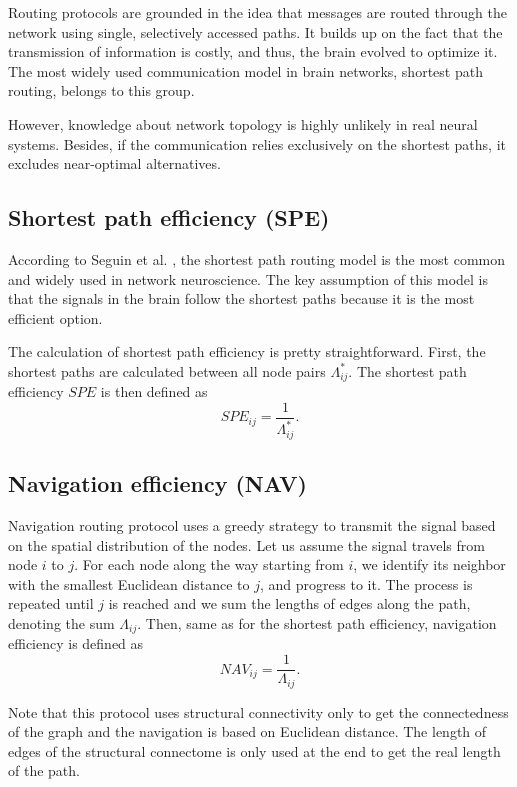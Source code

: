 Routing protocols are grounded in the idea that messages are routed through the network using single, selectively accessed paths. It builds up on the fact that the transmission of information is costly, and thus, the brain evolved to optimize it. The most widely used communication model in brain networks, shortest path routing, belongs to this group. \cite{seguin_brain_2023}

However, knowledge about network topology is highly unlikely in real neural systems. Besides, if the communication relies exclusively on the shortest paths, it excludes near-optimal alternatives. \cite{avena-koenigsberger_communication_2018}

\subsection{Shortest path efficiency (SPE)}

According to Seguin et al. \cite{seguin_brain_2023}, the shortest path routing model is the most common and widely used in network neuroscience. The key assumption of this model is that the signals in the brain follow the shortest paths because it is the most efficient option.

The calculation of shortest path efficiency is pretty straightforward. First, the shortest paths are calculated between all node pairs $\Lambda^*_{ij}$. The shortest path efficiency $SPE$ is then defined as 
$$
SPE_{ij}=\frac{1}{\Lambda^*_{ij}}.
$$

\subsection{Navigation efficiency (NAV)}

Navigation routing protocol uses a greedy strategy to transmit the signal  based on the spatial distribution of the nodes. Let us assume the signal travels from node $i$ to $j$. For each node along the way starting from $i$, we identify its neighbor with the smallest Euclidean distance to $j$, and progress to it. The process is repeated until $j$ is reached and we sum the lengths of edges along the path, denoting the sum $\Lambda_{ij}$. Then, same as for the shortest path efficiency, navigation efficiency is defined as 
$$
NAV_{ij}=\frac{1}{\Lambda_{ij}}.
$$

Note that this protocol uses structural connectivity only to get the connectedness of the graph and the navigation is based on Euclidean distance. The length of edges of the structural connectome is only used at the end to get the real length of the path.

